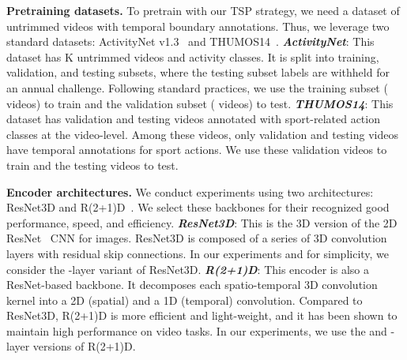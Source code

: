 \documentclass[10pt,twocolumn,letterpaper]{article}
\begin{document}
\noindent\textbf{Pretraining datasets.}
To pretrain with our TSP strategy, we need a dataset of untrimmed videos with temporal boundary annotations. Thus, we leverage two standard datasets: ActivityNet v1.3~\cite{dataset_activitynet} and THUMOS14~\cite{dataset_thumos14}.
\textbf{\textit{ActivityNet}}: This dataset has K untrimmed videos and  activity classes. It is split into training, validation, and testing subsets, where the testing subset labels are withheld for an annual challenge. Following standard practices, we use the training subset ( videos) to train and the validation subset ( videos) to test.
\textbf{\textit{THUMOS14}}: This dataset has  validation and  testing videos annotated with  sport-related action classes at the video-level. Among these videos, only  validation and  testing videos have temporal annotations for  sport actions. We use these  validation videos to train and the  testing videos to test.


\vspace{3pt}\noindent\textbf{Encoder architectures.}
We conduct experiments using two architectures: ResNet3D and R(2+1)D~\cite{tran2018closer}. We select these backbones for their recognized good performance, speed, and efficiency.
\textbf{\textit{ResNet3D}}: This is the 3D version of the 2D ResNet~\cite{he2016deep} CNN for images. ResNet3D is composed of a series of 3D convolution layers with residual skip connections. In our experiments and for simplicity, we consider the -layer variant of ResNet3D.
\textbf{\textit{R(2+1)D}}: This encoder is also a ResNet-based backbone. It decomposes each spatio-temporal 3D convolution kernel into a 2D (spatial) and a 1D (temporal) convolution. Compared to ResNet3D, R(2+1)D is more efficient and light-weight, and it has been shown to maintain high performance on video tasks. In our experiments, we use the  and -layer versions of R(2+1)D.
\end{document}
